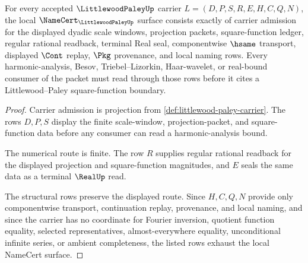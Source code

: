 \begin{theorem}
\label{thm:littlewood-paley-namecert-obligations}
For every accepted $\LittlewoodPaleyUp$ carrier $L=(D,P,S,R,E,H,C,Q,N)$, the local $\NameCert_{\LittlewoodPaleyUp}$ surface consists exactly of carrier admission for the displayed dyadic scale windows, projection packets, square-function ledger, regular rational readback, terminal Real seal, componentwise $\hsame$ transport, displayed $\Cont$ replay, $\Pkg$ provenance, and local naming rows. Every harmonic-analysis, Besov, Triebel--Lizorkin, Haar-wavelet, or real-bound consumer of the packet must read through those rows before it cites a Littlewood--Paley square-function boundary.
\end{theorem}
\begin{proof}
Carrier admission is projection from \autoref{def:littlewood-paley-carrier}. The rows $D,P,S$ display the finite scale-window, projection-packet, and square-function data before any consumer can read a harmonic-analysis bound.

The numerical route is finite. The row $R$ supplies regular rational readback for the displayed projection and square-function magnitudes, and $E$ seals the same data as a terminal $\RealUp$ read.

The structural rows preserve the displayed route. Since $H,C,Q,N$ provide only componentwise transport, continuation replay, provenance, and local naming, and since the carrier has no coordinate for Fourier inversion, quotient function equality, selected representatives, almost-everywhere equality, unconditional infinite series, or ambient completeness, the listed rows exhaust the local NameCert surface.
\end{proof}

